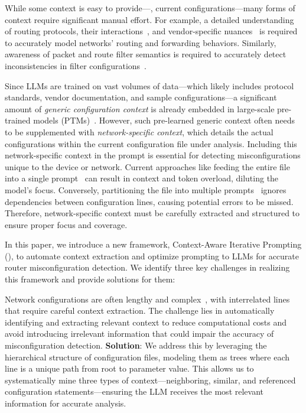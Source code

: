 While some context is easy to provide---\eg, current config\-urations---many forms of context require significant manual effort. For example, a detailed understanding of routing protocols, their interactions~\cite{le2007rr}, and vendor-specific nuances~\cite{ye2020hoyan} is required to accurately model networks' routing and forwarding behaviors. Similarly, awareness of packet and route filter semantics is required to accurately detect inconsistencies in filter configurations~\cite{kakarla2020finding}.

Since LLMs are trained on vast volumes of data---which likely includes protocol standards, vendor documentation, and sample configurations---a significant amount of \textit{generic configuration context} is already embedded in large-scale pre-trained models (PTMs)~\cite{qiu2020pre}. However, such pre-learned generic context often needs to be supplemented with \textit{network-specific context}, which details the actual configurations within the current configuration file under analysis. Including this network-specific context in the prompt is essential for detecting misconfigurations unique to the device or network.
Current approaches like feeding the entire file into a single prompt~\cite{lican,li2024long} can result in context and token overload, diluting the model's focus. Conversely, partitioning the file into multiple prompts~\cite{lian2023configuration,chen2024automatic,wang2024identifying} ignores dependencies between configuration lines, causing potential errors to be missed. Therefore, network-specific context must be carefully extracted and structured to ensure proper focus and coverage.

In this paper, we introduce a new framework, Context-Aware Iterative Prompting (\sysname{}), to automate context extraction and optimize prompting to LLMs for accurate router misconfiguration detection. We identify three key challenges in realizing this framework and provide solutions for them:

Network configurations are often lengthy and complex~\cite{benson2009complexitymetrics}, with interrelated lines that require careful context extraction. The challenge lies in automatically identifying and extracting relevant context to reduce computational costs and avoid introducing irrelevant information that could impair the accuracy of misconfiguration detection. \textbf{Solution}: We address this by leveraging the hierarchical structure of configuration files, modeling them as trees where each line is a unique path from root to parameter value. This allows us to systematically mine three types of context---neighboring, similar, and referenced configuration statements---ensuring the LLM receives the most relevant information for accurate analysis.

